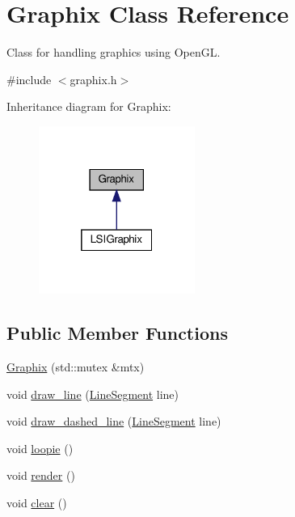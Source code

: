 \hypertarget{classGraphix}{}\section{Graphix Class Reference}
\label{classGraphix}


Class for handling graphics using Open\+GL.  




{\ttfamily \#include $<$graphix.\+h$>$}



Inheritance diagram for Graphix\+:
\nopagebreak
\begin{figure}[H]
\begin{center}
\leavevmode
\includegraphics[width=145pt]{classGraphix__inherit__graph}
\end{center}
\end{figure}
\subsection*{Public Member Functions}
\begin{DoxyCompactItemize}
\item 
\hyperlink{classGraphix_a1d4cb173e0d22fee13a657489b7b55de}{Graphix} (std\+::mutex \&mtx)
\item 
void \hyperlink{classGraphix_af2bd73aa70b282536cbfd2c19f0352bf}{draw\+\_\+line} (\hyperlink{classLineSegment}{Line\+Segment} line)
\item 
void \hyperlink{classGraphix_af03ba028ad5bbb721a798c5b48450444}{draw\+\_\+dashed\+\_\+line} (\hyperlink{classLineSegment}{Line\+Segment} line)
\item 
void \hyperlink{classGraphix_af7b539b3ab40274dc2f89d060cba0c51}{loopie} ()
\item 
void \hyperlink{classGraphix_a3e24075d5ded3741a9c14a7978b721d8}{render} ()
\item 
void \hyperlink{classGraphix_a1ac1a5725a869ef074da6fe3cab29b0e}{clear} ()
\end{DoxyCompactItemize}
